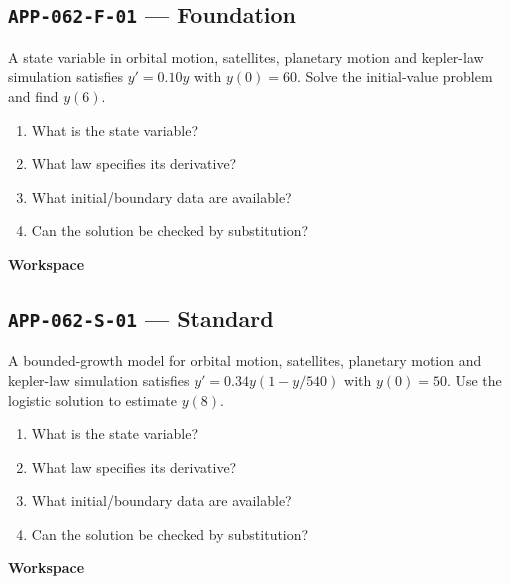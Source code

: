 \documentclass[11pt]{book}
\newcommand{\pid}[1]{\texttt{#1}}
\newcommand{\workspace}{\par\vspace{0.7in}\hrulefill\par\vspace{0.55in}\hrulefill\par}
\begin{document}
\subsection*{\pid{APP-062-F-01} — Foundation}
\begin{problembox}
A state variable in orbital motion, satellites, planetary motion and kepler-law simulation satisfies $y'=0.10y$ with $y(0)=60$. Solve the initial-value problem and find $y(6)$.
\end{problembox}
\begin{promptbox}\begin{enumerate}
\item What is the state variable?
\item What law specifies its derivative?
\item What initial/boundary data are available?
\item Can the solution be checked by substitution?
\end{enumerate}\end{promptbox}
\textbf{Workspace}\workspace
{}
\subsection*{\pid{APP-062-S-01} — Standard}
\begin{problembox}
A bounded-growth model for orbital motion, satellites, planetary motion and kepler-law simulation satisfies $y'=0.34y(1-y/540)$ with $y(0)=50$. Use the logistic solution to estimate $y(8)$.
\end{problembox}
\begin{promptbox}\begin{enumerate}
\item What is the state variable?
\item What law specifies its derivative?
\item What initial/boundary data are available?
\item Can the solution be checked by substitution?
\end{enumerate}\end{promptbox}
\textbf{Workspace}\workspace
{}
\end{document}
